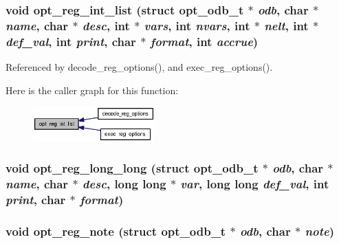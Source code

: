 \subsubsection[{opt\_\-reg\_\-int\_\-list}]{\setlength{\rightskip}{0pt plus 5cm}void opt\_\-reg\_\-int\_\-list (struct {\bf opt\_\-odb\_\-t} $\ast$ {\em odb}, \/  char $\ast$ {\em name}, \/  char $\ast$ {\em desc}, \/  int $\ast$ {\em vars}, \/  int {\em nvars}, \/  int $\ast$ {\em nelt}, \/  int $\ast$ {\em def\_\-val}, \/  int {\em print}, \/  char $\ast$ {\em format}, \/  int {\em accrue})}\label{options_8h_60f1bb4c4b37899e70b8250dfd5c7df7}




Referenced by decode\_\-reg\_\-options(), and exec\_\-reg\_\-options().

Here is the caller graph for this function:\nopagebreak
\begin{figure}[H]
\begin{center}
\leavevmode
\includegraphics[width=133pt]{options_8h_60f1bb4c4b37899e70b8250dfd5c7df7_icgraph}
\end{center}
\end{figure}
\subsubsection[{opt\_\-reg\_\-long\_\-long}]{\setlength{\rightskip}{0pt plus 5cm}void opt\_\-reg\_\-long\_\-long (struct {\bf opt\_\-odb\_\-t} $\ast$ {\em odb}, \/  char $\ast$ {\em name}, \/  char $\ast$ {\em desc}, \/  long long $\ast$ {\em var}, \/  long long {\em def\_\-val}, \/  int {\em print}, \/  char $\ast$ {\em format})}\label{options_8h_1272c126bc4795af0d6dcdca2e980356}


\subsubsection[{opt\_\-reg\_\-note}]{\setlength{\rightskip}{0pt plus 5cm}void opt\_\-reg\_\-note (struct {\bf opt\_\-odb\_\-t} $\ast$ {\em odb}, \/  char $\ast$ {\em note})}\label{options_8h_82f126f3dc50479ca8e9ed237da85e7a}


